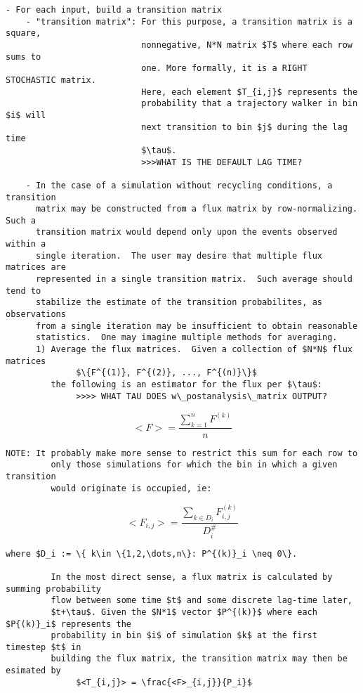 \documentclass[10pt]{article}
\begin{document}
\begin{Verbatim}[commandchars=\\\{\},codes={\catcode`$=3\catcode`^=7\catcode`_=8}]
  - For each input, build a transition matrix 
    - "transition matrix": For this purpose, a transition matrix is a square,
                           nonnegative, N*N matrix $T$ where each row sums to 
                           one. More formally, it is a RIGHT STOCHASTIC matrix.  
                           Here, each element $T_{i,j}$ represents the 
                           probability that a trajectory walker in bin $i$ will
                           next transition to bin $j$ during the lag time 
                           $\tau$. 
                           >>>WHAT IS THE DEFAULT LAG TIME?

    - In the case of a simulation without recycling conditions, a transition
      matrix may be constructed from a flux matrix by row-normalizing. Such a
      transition matrix would depend only upon the events observed within a 
      single iteration.  The user may desire that multiple flux matrices are 
      represented in a single transition matrix.  Such average should tend to
      stabilize the estimate of the transition probabilites, as observations 
      from a single iteration may be insufficient to obtain reasonable
      statistics.  One may imagine multiple methods for averaging.
      1) Average the flux matrices.  Given a collection of $N*N$ flux matrices
              $\{F^{(1)}, F^{(2)}, ..., F^{(n)}\}$
         the following is an estimator for the flux per $\tau$:
              >>>> WHAT TAU DOES w\_postanalysis\_matrix OUTPUT?
\end{Verbatim}

              \[ <F> = \frac{\sum_{k=1}^{n} F^{(k)}}{n} \]

\begin{Verbatim}[commandchars=\\\{\},codes={\catcode`$=3\catcode`^=7\catcode`_=8}]
         NOTE: It probably make more sense to restrict this sum for each row to
         only those simulations for which the bin in which a given transition
         would originate is occupied, ie:
\end{Verbatim}

              \[ <F_{i,j}> = \frac{\sum_{k\in D_{i}} F^{(k)}_{i,j}}{D_{i}^\#} \]
        
\begin{Verbatim}[commandchars=\\\{\},codes={\catcode`$=3\catcode`^=7\catcode`_=8}]
         where $D_i := \{ k\in \{1,2,\dots,n\}: P^{(k)}_i \neq 0\}.

         In the most direct sense, a flux matrix is calculated by summing probability 
         flow between some time $t$ and some discrete lag-time later, 
         $t+\tau$. Given the $N*1$ vector $P^{(k)}$ where each $P{(k)}_i$ represents the 
         probability in bin $i$ of simulation $k$ at the first timestep $t$ in 
         building the flux matrix, the transition matrix may then be esimated by 
              $<T_{i,j}> = \frac{<F>_{i,j}}{P_i}$
\end{Verbatim}
               
\end{document}

